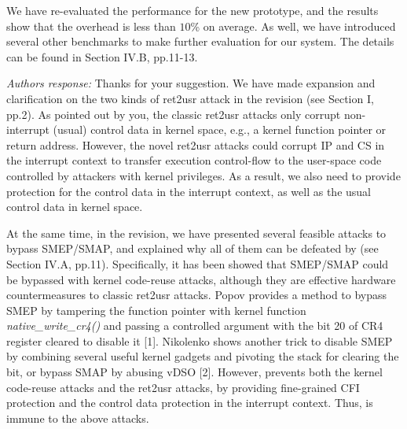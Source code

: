 \documentclass[oneside, 11pt]{article}
\begin{document}
We have re-evaluated the performance for the new prototype, and the
results show that the overhead is less than $10$\% on average.
As well, we have introduced several other benchmarks to make further
evaluation for our system. The details can be found in Section IV.B, pp.11-13.




\smallskip
\smallskip
\smallskip
{}


{\em Authors response:}
Thanks for your suggestion. We have made expansion and clarification on the
two kinds of ret2usr attack in the revision (see Section I, pp.2).
As pointed out by you, the classic ret2usr attacks only corrupt
non-interrupt (usual) control data in kernel space, e.g., a kernel function pointer
or return address. However, the novel ret2usr attacks could corrupt IP and CS
in the interrupt context to transfer execution control-flow to the user-space code
controlled by attackers with kernel privileges. As a result, we also need to
provide protection for the control data in the
interrupt context, as well as the usual control data in kernel space.

At the same time, in the revision, we have presented several feasible
attacks to bypass SMEP/SMAP, and explained why all of them can be defeated by
\TheName{} (see Section IV.A, pp.11).
Specifically, it has been showed that SMEP/SMAP could be bypassed with kernel code-reuse
attacks, although they are effective hardware countermeasures to classic ret2usr attacks.
Popov provides a method to bypass SMEP by tampering the function pointer with
kernel function \emph{native\_write\_cr4()} and passing a controlled argument with
the bit 20 of CR4 register cleared to disable it [1].
Nikolenko shows another trick to disable SMEP by combining several useful kernel gadgets
and pivoting the stack for clearing the bit, or bypass SMAP by abusing vDSO [2].
However, \TheName{} prevents both the kernel code-reuse attacks and the ret2usr attacks,
by providing fine-grained CFI protection and the control data protection in the interrupt context.
Thus, \TheName{} is immune to the above attacks.
\end{document}

